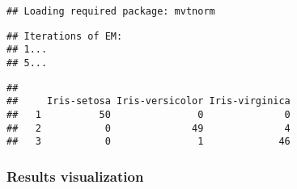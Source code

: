 \documentclass[
]{article}
\newenvironment{Shaded}{\begin{snugshade}}{\end{snugshade}}
\newcommand{\FunctionTok}[1]{\textcolor[rgb]{0.13,0.29,0.53}{\textbf{#1}}}
\newcommand{\NormalTok}[1]{#1}
\newcommand{\SpecialCharTok}[1]{\textcolor[rgb]{0.81,0.36,0.00}{\textbf{#1}}}
\begin{document}
\begin{verbatim}
## Loading required package: mvtnorm
\end{verbatim}

\begin{verbatim}
## Iterations of EM: 
## 1...
## 5...
\end{verbatim}

\begin{Shaded}
\end{Shaded}

\begin{verbatim}
##    
##     Iris-setosa Iris-versicolor Iris-virginica
##   1          50               0              0
##   2           0              49              4
##   3           0               1             46
\end{verbatim}

\subsubsection{Results visualization}\label{results-visualization}
\end{document}

